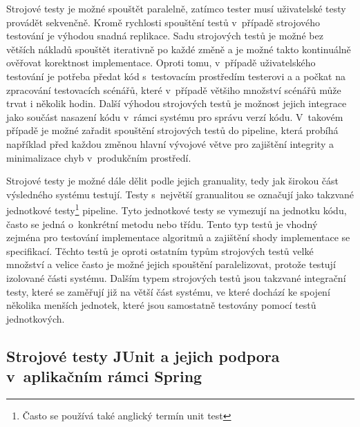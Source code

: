 Strojové testy je možné spouštět paralelně, zatímco tester musí uživatelské testy provádět sekvenčně. Kromě rychlosti spouštění testů v~případě strojového testování je výhodou snadná replikace. Sadu strojových testů je možné bez větších nákladů spouštět iterativně po každé změně a je možné takto kontinuálně ověřovat korektnost implementace. Oproti tomu, v~případě uživatelského testování je potřeba předat kód s~testovacím prostředím testerovi a a počkat na zpracování testovacích scénářů, které v~případě většiho množství scénářů může trvat i několik hodin. Další výhodou strojových testů je možnost jejich integrace jako součást nasazení kódu v~rámci systému pro správu verzí kódu. V~takovém případě je možné zařadit spouštění strojových testů do pipeline, která probíhá například před každou změnou hlavní vývojové větve pro zajištění integrity a minimalizace chyb v~produkčním prostředí.

Strojové testy je možné dále dělit podle jejich granuality, tedy jak širokou část výsledného systému testují. Testy s~největší granualitou se označují jako takzvané jednotkové testy\footnote{Často se používá také anglický termín unit test} pipeline. Tyto jednotkové testy se vymezují na jednotku kódu, často se jedná o~konkrétní metodu nebo třídu. Tento typ testů je vhodný zejména pro testování implementace algoritmů a zajištění shody implementace se specifikací. Těchto testů je oproti ostatním typům strojových testů velké množství a velice často je možné jejich spouštění paralelizovat, protože testují izolované části systému. Dalším typem strojových testů jsou takzvané integrační testy, které se zaměřují již na větší část systému, ve které dochází ke spojení několika menších jednotek, které jsou samostatně testovány pomocí testů jednotkových. 


\subsection{Strojové testy JUnit a jejich podpora v~aplikačním rámci Spring}

